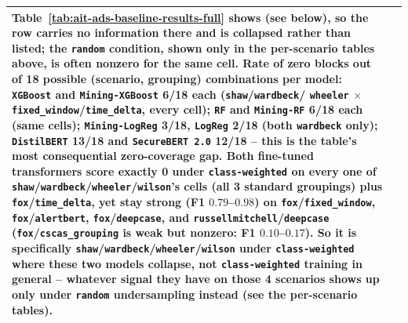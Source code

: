 \begin{table}[htbp]
\begin{tabular}{p{}p{}}
Table~\ref{tab:ait-ads-baseline-results-full} shows (see below), so the row
carries no information there and is collapsed rather than listed; the
\texttt{random} condition, shown only in the per-scenario tables above, is
often nonzero for the same cell. Rate of zero blocks out of 18 possible
(scenario, grouping) combinations per model: \texttt{XGBoost} and
\texttt{Mining-XGBoost} 6/18 each (\texttt{shaw}/\texttt{wardbeck}/
\texttt{wheeler} $\times$ \texttt{fixed\_window}/\texttt{time\_delta}, every
cell); \texttt{RF} and \texttt{Mining-RF} 6/18 each (same cells);
\texttt{Mining-LogReg} 3/18, \texttt{LogReg} 2/18 (both \texttt{wardbeck}
only); \texttt{DistilBERT} 13/18 and \texttt{SecureBERT 2.0} 12/18 -- this is
the table's most consequential zero-coverage gap. Both fine-tuned
transformers score exactly 0 under \texttt{class-weighted} on every one of
\texttt{shaw}/\texttt{wardbeck}/\texttt{wheeler}/\texttt{wilson}'s cells
(all 3 standard groupings) plus \texttt{fox}/\texttt{time\_delta}, yet stay
strong (F1 $0.79$--$0.98$) on \texttt{fox}/\texttt{fixed\_window},
\texttt{fox}/\texttt{alertbert}, \texttt{fox}/\texttt{deepcase}, and
\texttt{russellmitchell}/\texttt{deepcase} (\texttt{fox}/\texttt{cscas\_grouping}
is weak but nonzero: F1 $0.10$--$0.17$). So it is specifically
\texttt{shaw}/\texttt{wardbeck}/\texttt{wheeler}/\texttt{wilson} under
\texttt{class-weighted} where these two models collapse, not
\texttt{class-weighted} training in general -- whatever signal they have on
those 4 scenarios shows up only under \texttt{random} undersampling instead
(see the per-scenario tables). \\
\bottomrule
\end{tabular}
\end{table}
